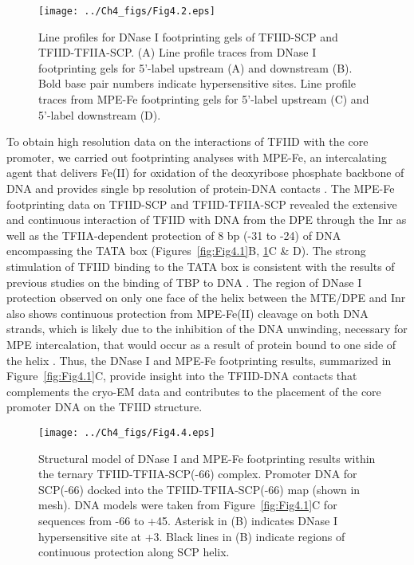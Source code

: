 \begin{figure}
\centering
\texttt{[image: ../Ch4\_figs/Fig4.2.eps]}
\caption[Line profiles for DNase I footprinting gels of TFIID-SCP and TFIID-TFIIA-SCP]{Line profiles for DNase I footprinting gels of TFIID-SCP and TFIID-TFIIA-SCP. (A) Line profile traces from DNase I footprinting gels for 5’-label upstream (A) and downstream (B). Bold base pair numbers indicate hypersensitive sites. Line profile traces from MPE-Fe footprinting gels for 5’-label upstream (C) and 5’-label downstream (D).}
\label{fig:Fig4.2}
\end{figure}
\indent To obtain high resolution data on the interactions of TFIID with the core promoter, we carried out footprinting analyses with MPE-Fe, an intercalating agent that delivers Fe(II) for oxidation of the deoxyribose phosphate backbone of DNA and provides single bp resolution of protein-DNA contacts \cite{Hertzberg_3897,Papavassiliou_3156,Va_3928}. The MPE-Fe footprinting data on TFIID-SCP and TFIID-TFIIA-SCP revealed the extensive and continuous interaction of TFIID with DNA from the DPE through the Inr as well as the TFIIA-dependent protection of 8 bp (-31 to -24) of DNA encompassing the TATA box (Figures~\ref{fig:Fig4.1}B, \ref{fig:Fig4.2}C \& D). The strong stimulation of TFIID binding to the TATA box is consistent with the results of previous studies on the binding of TBP to DNA \cite{Geiger_2949,Kim_3416,Kim_3377,Nikolov_3177}. The region of DNase I protection observed on only one face of the helix between the MTE/DPE and Inr also shows continuous protection from MPE-Fe(II) cleavage on both DNA strands, which is likely due to the inhibition of the DNA unwinding, necessary for MPE intercalation, that would occur as a result of protein bound to one side of the helix \cite{Uchida_3659}. Thus, the DNase I and MPE-Fe footprinting results, summarized in Figure~\ref{fig:Fig4.1}C, provide insight into the TFIID-DNA contacts that complements the cryo-EM data and contributes to the placement of the core promoter DNA on the TFIID structure. \\
\begin{figure}
\centering
\texttt{[image: ../Ch4\_figs/Fig4.4.eps]}
\caption[Structural model of DNase I and MPE-Fe footprinting results within the ternary TFIID-TFIIA-SCP(-66) complex]{Structural model of DNase I and MPE-Fe footprinting results within the ternary TFIID-TFIIA-SCP(-66) complex. Promoter DNA for SCP(-66) docked into the TFIID-TFIIA-SCP(-66) map (shown in mesh). DNA models were taken from Figure~\ref{fig:Fig4.1}C for sequences from -66 to +45. Asterisk in (B) indicates DNase I hypersensitive site at +3. Black lines in (B) indicate regions of continuous protection along SCP helix. }
\label{fig:Fig4.4}
\end{figure}
